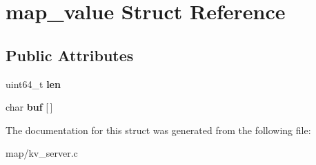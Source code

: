 \hypertarget{structmap__value}{}\section{map\+\_\+value Struct Reference}
\label{structmap__value}
\subsection*{Public Attributes}
\begin{DoxyCompactItemize}
\item 
\mbox{\label{structmap__value_ad20271f87a6e683161477aa988f6a248}} 
uint64\+\_\+t {\bfseries len}
\item 
\mbox{\label{structmap__value_ab2d92c7a2bedc1b1401f93c8a68837ae}} 
char {\bfseries buf} \mbox{[}$\,$\mbox{]}
\end{DoxyCompactItemize}


The documentation for this struct was generated from the following file\+:\begin{DoxyCompactItemize}
\item 
map/kv\+\_\+server.\+c\end{DoxyCompactItemize}
